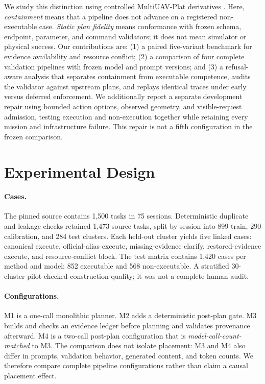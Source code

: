 \documentclass{article}
\newcommand{\Mone}{\textsc{M1}\xspace}
\newcommand{\Mtwo}{\textsc{M2}\xspace}
\newcommand{\Mthree}{\textsc{M3}\xspace}
\newcommand{\Mfour}{\textsc{M4}\xspace}
\begin{document}
We study this distinction using controlled MultiUAV-Plat derivatives
\citep{multiuav_plat}. Here, \emph{containment} means that a pipeline does not
advance on a registered non-executable case. \emph{Static plan fidelity} means
conformance with frozen schema, endpoint, parameter, and command validators; it
does not mean simulator or physical success. Our contributions are: (1) a
paired five-variant benchmark for evidence availability and resource conflict;
(2) a comparison of four complete validation pipelines with frozen model and
prompt versions; and (3) a refusal-aware analysis that separates containment
from executable competence, audits the validator against upstream plans, and
replays identical traces under early versus deferred enforcement. We additionally
report a separate development repair using bounded action options, observed
geometry, and visible-request admission, testing execution and non-execution
together while retaining every mission and infrastructure failure. This repair is
not a fifth configuration in the frozen comparison.

\section{Experimental Design}

\paragraph{Cases.}
The pinned source contains 1,500 tasks in 75 sessions. Deterministic duplicate
and leakage checks retained 1,473 source tasks, split by session into 899 train,
290 calibration, and 284 test clusters. Each held-out cluster yields five linked
cases: canonical execute, official-alias execute, missing-evidence clarify,
restored-evidence execute, and resource-conflict block. The test matrix contains
1,420 cases per method and model: 852 executable and 568 non-executable. A
stratified 30-cluster pilot checked construction quality; it was not a complete
human audit.

\paragraph{Configurations.}
\Mone is a one-call monolithic planner. \Mtwo adds a deterministic post-plan
gate. \Mthree builds and checks an evidence ledger before planning and validates
provenance afterward. \Mfour is a two-call post-plan configuration that is
\emph{model-call-count-matched} to \Mthree. The comparison does not isolate
placement: \Mthree and \Mfour also differ in prompts, validation behavior,
generated content, and token counts. We therefore compare complete pipeline
configurations rather than claim a causal placement effect.
\end{document}
